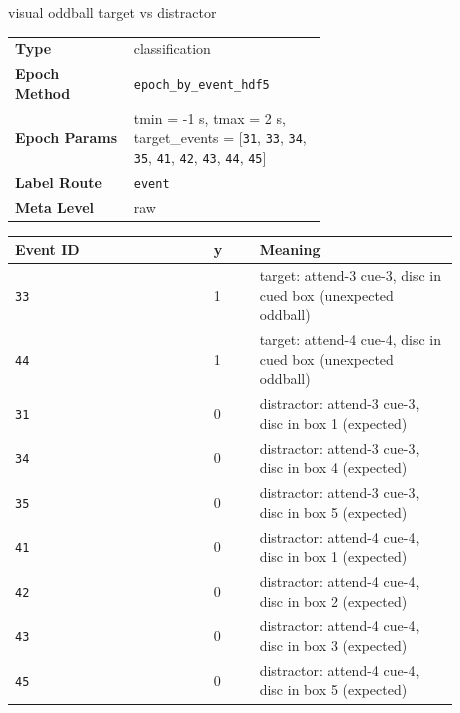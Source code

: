 {\begin{tcolorbox}
 {\footnotesize visual oddball target vs distractor}\par\smallskip
{\footnotesize\begin{tabular}{@{}lp{0.62\linewidth}@{}}
\textbf{Type} & classification \\
\textbf{Epoch Method} & \texttt{epoch\_by\_event\_hdf5} \\
\textbf{Epoch Params} & tmin = -1 s, tmax = 2 s, target\_events = [\texttt{31}, \texttt{33}, \texttt{34}, \texttt{35}, \texttt{41}, \texttt{42}, \texttt{43}, \texttt{44}, \texttt{45}] \\
\textbf{Label Route} & \texttt{event} \\
\textbf{Meta Level} & raw \\
\end{tabular}}
\par{}\par\smallskip
\begingroup\footnotesize
\begin{tabular}{@{}p{0.3911\linewidth}p{0.0978\linewidth}p{0.3911\linewidth}@{}}
\toprule
\textbf{Event ID} & \textbf{y} & \textbf{Meaning} \\
\midrule
\texttt{33} & 1 & target: attend-3 cue-3, disc in cued box (unexpected oddball) \\
\texttt{44} & 1 & target: attend-4 cue-4, disc in cued box (unexpected oddball) \\
\texttt{31} & 0 & distractor: attend-3 cue-3, disc in box 1 (expected) \\
\texttt{34} & 0 & distractor: attend-3 cue-3, disc in box 4 (expected) \\
\texttt{35} & 0 & distractor: attend-3 cue-3, disc in box 5 (expected) \\
\texttt{41} & 0 & distractor: attend-4 cue-4, disc in box 1 (expected) \\
\texttt{42} & 0 & distractor: attend-4 cue-4, disc in box 2 (expected) \\
\texttt{43} & 0 & distractor: attend-4 cue-4, disc in box 3 (expected) \\
\texttt{45} & 0 & distractor: attend-4 cue-4, disc in box 5 (expected) \\
\bottomrule
\end{tabular}
\endgroup
\par{}\par
\begin{itemize}[leftmargin=1.3em,noitemsep,topsep=1pt]

\end{itemize}
\end{tcolorbox}}
